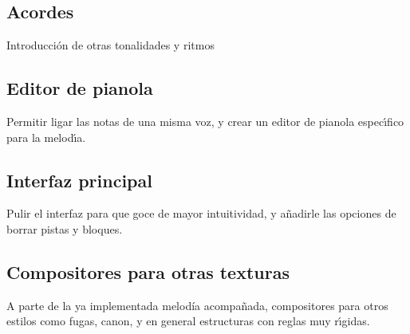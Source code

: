 \subsection {Acordes}

Introducci\'on de otras tonalidades y ritmos

\subsection {Editor de pianola}

Permitir ligar las notas de una misma voz, y crear un editor de pianola espec\'\i fico para la melod\'\i a.

\subsection {Interfaz principal}

Pulir el interfaz para que goce de mayor intuitividad, y a\~nadirle las opciones de borrar pistas y bloques.

\subsection {Compositores para otras texturas}

A parte de la ya implementada melod\'ia acompa\~nada, compositores para otros estilos como fugas, canon, y en general estructuras con reglas muy r\'\i gidas.

